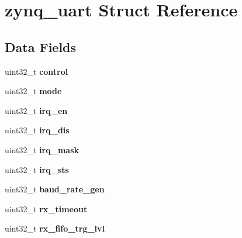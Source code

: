 \hypertarget{structzynq__uart}{}\section{zynq\+\_\+uart Struct Reference}
\label{structzynq__uart}
\subsection*{Data Fields}
\begin{DoxyCompactItemize}
\item 
\mbox{\label{structzynq__uart_acc1567d891700c2ec4ea1f5a9bb14ca9}} 
uint32\+\_\+t {\bfseries control}
\item 
\mbox{\label{structzynq__uart_a1e338a6f88f3b4a324981de0abb7131d}} 
uint32\+\_\+t {\bfseries mode}
\item 
\mbox{\label{structzynq__uart_a18f184f422a3c6e098571d7b5fa3d051}} 
uint32\+\_\+t {\bfseries irq\+\_\+en}
\item 
\mbox{\label{structzynq__uart_ab03e9cf8944331a2ea82ba08eb4cdf43}} 
uint32\+\_\+t {\bfseries irq\+\_\+dis}
\item 
\mbox{\label{structzynq__uart_a1d7024acbc2e15d8ec88fae0ed30af31}} 
uint32\+\_\+t {\bfseries irq\+\_\+mask}
\item 
\mbox{\label{structzynq__uart_a2c5065a7a6b182f514d03311c510cf0d}} 
uint32\+\_\+t {\bfseries irq\+\_\+sts}
\item 
\mbox{\label{structzynq__uart_a9171bd0ea8bb2cef08aa17a6263ee243}} 
uint32\+\_\+t {\bfseries baud\+\_\+rate\+\_\+gen}
\item 
\mbox{\label{structzynq__uart_a4dc2c98477b4f2cb4de85c32b19d2caa}} 
uint32\+\_\+t {\bfseries rx\+\_\+timeout}
\item 
\mbox{\label{structzynq__uart_a42be95fe5ffa054cc9e72dcfa27e03ef}} 
uint32\+\_\+t {\bfseries rx\+\_\+fifo\+\_\+trg\+\_\+lvl}
\item 
\mbox{\label{structzynq__uart_a81b87f3bce39cd06677dbe3e99adb68b}} 

\end{DoxyCompactItemize}
